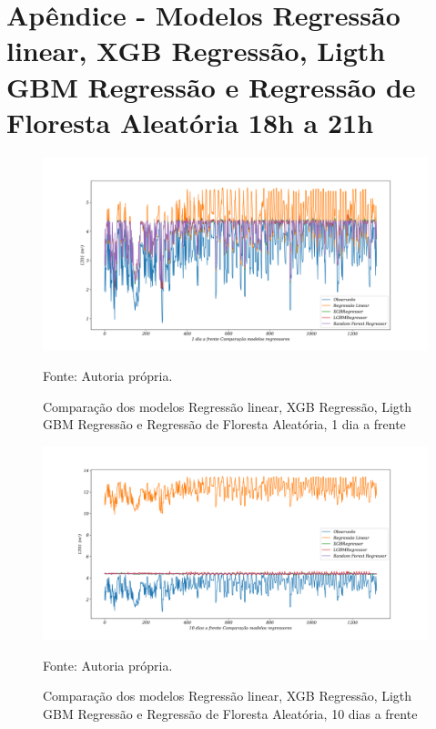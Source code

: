 
\section{Apêndice - Modelos Regressão linear, XGB Regressão, Ligth GBM Regressão e Regressão de Floresta Aleatória 18h a 21h}\label{sec:lrxgblgbmrf18}

\begin{figure}[H]
	\centering
	\caption{Comparação dos modelos Regressão linear, XGB Regressão, Ligth GBM Regressão e Regressão de Floresta Aleatória, 1 dia a frente }
	\label{fig:1-LR-XGB-LGBM-RF}
	\includegraphics[width=1\linewidth]{Apendices/Figuras/modelagem-18-a-21h/1-LR-XGB-LGBM-RF}
	
	Fonte: Autoria própria.
\end{figure}

\begin{figure}[H]
	\centering
	\caption{Comparação dos modelos Regressão linear, XGB Regressão, Ligth GBM Regressão e Regressão de Floresta Aleatória, 10 dias a frente }
	\label{fig:10-LR-XGB-LGBM-RF}
	\includegraphics[width=1\linewidth]{Apendices/Figuras/modelagem-18-a-21h/10-LR-XGB-LGBM-RF}
	
	Fonte: Autoria própria.
\end{figure}


